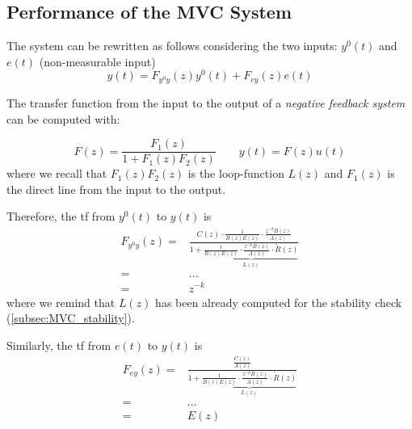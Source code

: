\subsection{Performance of the MVC System}\label{subsec:MVC_performance}

The system can be rewritten as follows considering the two inputs: $y^0(t)$ and $e(t)$ (non-measurable input)
\[ 
	y(t) = F_{y^0y}(z) y^0(t) + F_{ey}(z) e(t)
\]

\begin{recall}
    The transfer function from the input to the output of a \emph{negative feedback system} can be computed with:
    \begin{figure}[H]
        \centering
    \end{figure}

    \[ 
    	F(z) = \frac{F_1(z)}{1 + F_1(z) F_2(z)} \qquad y(t) = F(z) u(t)
    \]
    where we recall that $F_1(z) F_2(z)$ is the loop-function $L(z)$
 	and $F_1(z)$ is the direct line from the input to the output.
\end{recall}

Therefore, the \gls{tf} from $y^0(t)$ to $y(t)$ is
\begin{align*}
	F_{y^0y}(z) =& \frac{C(z) \cdot \frac{1}{B(z) E(z)} \cdot \frac{z^{-k} B(z)}{A(z)}}{1 + \underbrace{\frac{1}{B(z)E(z)}\cdot \frac{z^{-k}B(z)}{A(z)}\cdot\tilde{R}(z)}_{L(z)}} \\
	=& \dots \\
	=& z^{-k}
\end{align*}
where we remind that $L(z)$ has been already computed for the stability check (\ref{subsec:MVC_stability}). 

Similarly, the \gls{tf} from $e(t)$ to $y(t)$ is 
\begin{align*}
	F_{ey}(z) =& \frac{\frac{C(z)}{A(z)}}{1 + \underbrace{\frac{1}{B(z)E(z)}\cdot \frac{z^{-k}B(z)}{A(z)}\cdot\tilde{R}(z)}_{L(z)}} \\
	=& \dots \\
	=& E(z)
\end{align*}


